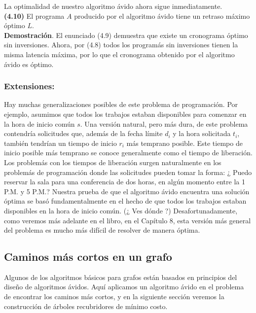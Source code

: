 \documentclass[a4paper]{article}
\begin{document}
La optimalidad de nuestro algoritmo ávido ahora sigue inmediatamente.\\

\textbf{(4.10)} El programa $A$ producido por el algoritmo ávido tiene un retraso máximo óptimo $L$.\\

\textbf{Demostración}. El enunciado (4.9) demuestra que existe un cronograma óptimo sin inversiones. Ahora, por (4.8) todos los programás sin inversiones tienen la misma latencia máxima, por lo que el cronograma obtenido por el algoritmo ávido es óptimo.\\

\subsubsection*{Extensiones:}
Hay muchas generalizaciones posibles de este problema de programación. Por ejemplo, asumimos que todos los trabajos estaban disponibles para comenzar en la hora de inicio común $s$. Una versión natural, pero más dura, de este problema contendría solicitudes que, además de la fecha límite $d_i$ y la hora solicitada $t_i$, también tendrían un tiempo de inicio $r_i$ más temprano posible. Este tiempo de inicio posible más temprano se conoce generalmente como el tiempo de liberación. Los problemás con los tiempos de liberación surgen naturalmente en los problemás de programación donde las solicitudes pueden tomar la forma: ¿ Puedo reservar la sala para una conferencia de dos horas, en algún momento entre la 1 P.M. y 5 P.M.? Nuestra prueba de que el algoritmo ávido encuentra una solución óptima se basó fundamentalmente en el hecho de que todos los trabajos estaban disponibles en la hora de inicio común. (¿ Ves dónde ?) Desafortunadamente, como veremos más adelante en el libro, en el Capítulo 8, esta versión más general del problema es mucho más difícil de resolver de manera óptima.\\




\subsection{Caminos más cortos en un grafo}
Algunos de los algoritmos básicos para grafos están basados en principios del diseño de algoritmos ávidos. Aquí aplicamos un algoritmo ávido en el problema de encontrar los caminos más cortos, y en la siguiente sección veremos la construcción de árboles recubridores de mínimo costo.\\\\
\end{document}

